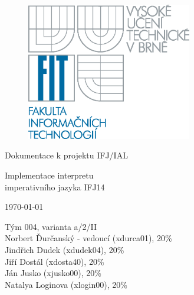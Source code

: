 \documentclass[12pt,a4paper,titlepage,final]{report}
\begin{document}
\def\projname{Dokumentace k projektu IFJ/IAL}
\def\projname{Implementace interpretu\\ imperativního jazyka IFJ14}
\begin{titlepage}
\begin{figure}[!h]
\centering
\includegraphics[height=6cm]{img/czlogo}
\end{figure}
\vfill
\begin{center}
\bigskip
\begin{large}
Dokumentace k projektu IFJ/IAL\\
\end{large}
\begin{Huge}
\projname\\
\end{Huge}
\end{center}
\vfill
\begin{center}
\begin{Large}
\today
\end{Large}
\end{center}
\vfill
\begin{flushleft}
\begin{large}
Tým 004, varianta a/2/II\\
\vfill
Norbert Ďurčanský - vedoucí (xdurca01), 20\% \\
Jindřich Dudek (xdudek04), 20\% \\
Jiří Dostál (xdosta40), 20\% \\
Ján Jusko (xjusko00), 20\% \\
Natalya Loginova (xlogin00), 20\% \\
\end{large}
\end{flushleft}
\end{titlepage}
\end{document}
